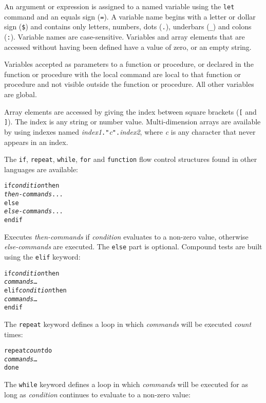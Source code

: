 An argument or expression is assigned to a named variable using the
\texttt{let} command and an equals sign (\texttt{=}).  A variable name begins
with a letter or dollar sign (\texttt{\$}) and contains only letters, numbers,
dots (\texttt{.}), underbars (\texttt{\_}) and colons (\texttt{:}).
Variable names are
case-sensitive.  Variables and array elements that are accessed without having
been defined have a value of zero, or an empty string.

Variables accepted as parameters to a function or procedure, or declared in the
function or procedure with the local command are local to that function or
procedure and not visible outside the function or procedure.  All other
variables are global.

Array elements are accessed by giving the index between
square brackets (\texttt{[} and \texttt{]}).
The index is any string or number value.
Multi-dimension arrays are available by using
indexes named \textit{index1}\texttt{."}\textit{c}\texttt{".}\textit{index2},
where \textit{c} is any character that never appears in an index.

The \texttt{if}, \texttt{repeat}, \texttt{while}, \texttt{for}
and \texttt{function} flow control structures
found in other languages are available:

\begin{alltt}
if \textit{condition} then
  \textit{then-commands} ...
else
  \textit{else-commands} ...
endif
\end{alltt}

Executes \textit{then-commands} if \textit{condition} evaluates to
a non-zero value, otherwise \textit{else-commands} are executed.
The \texttt{else} part is optional.
Compound tests are built using the \texttt{elif} keyword:

\begin{alltt}
if \textit{condition} then
  \textit{commands} \dots
elif \textit{condition} then
  \textit{commands} \dots
endif
\end{alltt}

The \texttt{repeat} keyword defines a loop in which
\textit{commands} will be executed \textit{count}
times:

\begin{alltt}
repeat \textit{count} do
  \textit{commands} \dots
done
\end{alltt}

The \texttt{while} keyword defines a loop in which
\textit{commands} will be executed for as long
as \textit{condition} continues to evaluate to a non-zero value:

